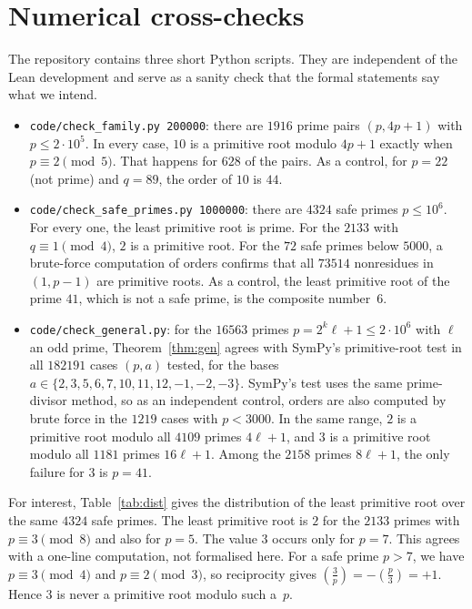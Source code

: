 \documentclass[11pt]{article}
\theoremstyle{remark}
\newcommand{\leg}[2]{\left(\frac{#1}{#2}\right)}
\begin{document}
\section{Numerical cross-checks}

The repository contains three short Python scripts. They are independent of the Lean development and
serve as a sanity check that the formal statements say what we intend.
\begin{itemize}
\item \texttt{code/check\_family.py 200000}: there are $1916$ prime pairs $(p,4p+1)$ with
$p\leq 2\cdot 10^5$. In every case, $10$ is a primitive root modulo $4p+1$ exactly when
$p\equiv2\pmod5$. That happens for $628$ of the pairs. As a control, for $p=22$ (not prime) and
$q=89$, the order of $10$ is $44$.
\item \texttt{code/check\_safe\_primes.py 1000000}: there are $4324$ safe primes $p\leq 10^6$.
For every one, the least primitive root is prime. For the $2133$ with $q\equiv1\pmod4$, $2$ is a
primitive root. For the $72$ safe primes below $5000$, a brute-force computation of orders confirms
that all $73514$ nonresidues in $(1,p-1)$ are primitive roots. As a control, the least primitive
root of the prime $41$, which is not a safe prime, is the composite number~$6$.
\item \texttt{code/check\_general.py}: for the $16563$ primes $p=2^k\ell+1\leq 2\cdot10^6$ with
$\ell$ an odd prime, Theorem~\ref{thm:gen} agrees with SymPy's primitive-root test in all
$182191$ cases $(p,a)$ tested, for the bases $a\in\{2,3,5,6,7,10,11,12,-1,-2,-3\}$. SymPy's test
uses the same prime-divisor method, so as an independent control, orders are also computed by
brute force in the $1219$ cases with $p<3000$. In the same range, $2$ is a primitive root modulo all $4109$ primes $4\ell+1$, and
$3$ is a primitive root modulo all $1181$ primes $16\ell+1$. Among the $2158$ primes $8\ell+1$,
the only failure for $3$ is $p=41$.
\end{itemize}

For interest, Table~\ref{tab:dist} gives the distribution of the least primitive root over the
same $4324$ safe primes. The least primitive root is $2$ for the $2133$ primes with
$p\equiv 3\pmod 8$ and also for $p=5$. The value $3$ occurs only for $p=7$. This agrees with a
one-line computation, not formalised here. For a safe prime $p>7$, we have $p\equiv 3\pmod 4$
and $p\equiv 2\pmod 3$, so reciprocity gives $\leg{3}{p}=-\leg{p}{3}=+1$. Hence $3$ is never a
primitive root modulo such a~$p$.
\end{document}
